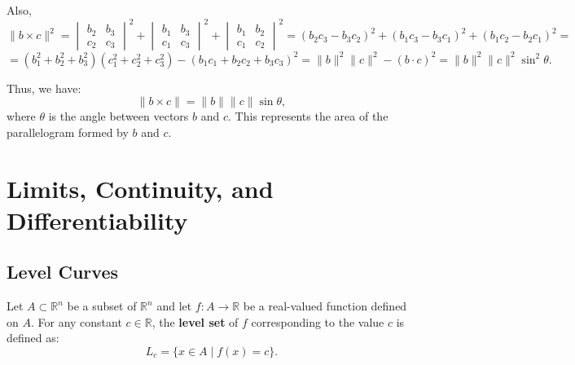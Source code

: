 \documentclass[11pt]{article}
\begin{document}
Also, 
\[\|b \times c\|^2 = \begin{vmatrix}
b_2 & b_3 \\
c_2 & c_3
\end{vmatrix}^2 + \begin{vmatrix}
b_1 & b_3 \\
c_1 & c_3
\end{vmatrix}^2 + \begin{vmatrix}
b_1 & b_2 \\
c_1 & c_2
\end{vmatrix}^2 = (b_2 c_3 - b_3 c_2)^2 + (b_1 c_3 - b_3 c_1)^2 + (b_1 c_2 - b_2 c_1)^2 = \]
\[= (b_1^2 + b_2^2 + b_3^2)(c_1^2 + c_2^2 + c_3^2) - (b_1 c_1 + b_2 c_2 + b_3 c_3)^2 = \|b\|^2 \|c\|^2 - (b \cdot c)^2 = \|b\|^2 \|c\|^2 \sin^2 \theta.\]

Thus, we have:
\[\|b \times c\| = \|b\| \|c\| \sin \theta,\]
where $\theta$ is the angle between vectors $b$ and $c$. This represents the area of the parallelogram formed by $b$ and $c$.
\begin{center}
\end{center}
\pagebreak
\section{Limits, Continuity, and Differentiability}
\subsection{Level Curves}
Let $A \subset \mathbb{R}^n$ be a subset of $\mathbb{R}^n$ and let $f : A \to \mathbb{R}$ be a real-valued function defined on $A$. For any constant $c \in \mathbb{R}$, the \textbf{level set} of $f$ corresponding to the value $c$ is defined as:
\[ L_c = \{ x \in A \mid f(x) = c \}. \]
\end{document}
